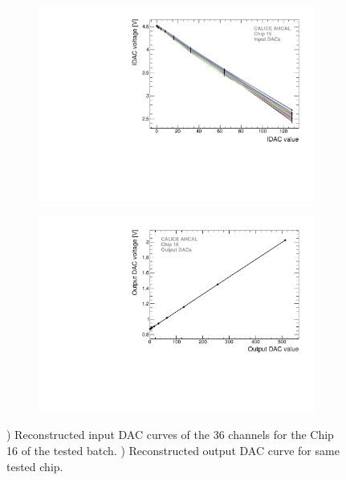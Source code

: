\begin{figure}[htbp!]
  \centering
  \begin{subfigure}[t]{0.49\textwidth}
    \includegraphics[width=1.\linewidth]{../Thesis_Plots/Commissioning/Plots/IDACs_Chip16.pdf}
    \caption{} \label{fig:IDAC}
  \end{subfigure}
  \hfill
  \begin{subfigure}[t]{0.49\textwidth}
    \includegraphics[width=1.\linewidth]{../Thesis_Plots/Commissioning/Plots/OutDACs_Chip16.pdf}
    \caption{} \label{fig:OutDAC}
  \end{subfigure}
  \caption{) Reconstructed input DAC curves of the 36 channels for the Chip 16 of the tested batch. ) Reconstructed output DAC curve for same tested chip.}
\end{figure}

